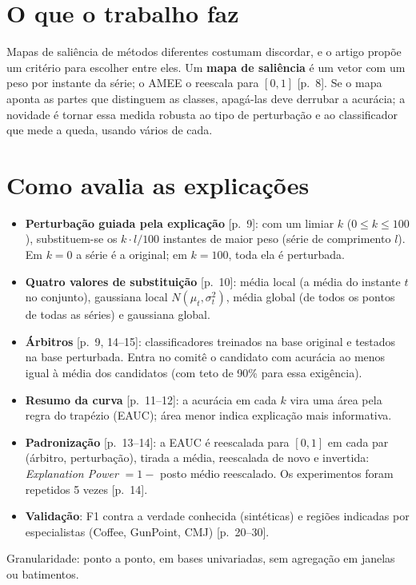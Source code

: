 \documentclass[11pt,a4paper]{article}
\begin{document}
\section{O que o trabalho faz}
Mapas de saliência de métodos diferentes costumam discordar, e o artigo propõe um critério para escolher entre eles. Um \textbf{mapa de saliência} é um vetor com um peso por instante da série; o AMEE o reescala para $[0,1]$ [p.~8]. Se o mapa aponta as partes que distinguem as classes, apagá-las deve derrubar a acurácia; a novidade é tornar essa medida robusta ao tipo de perturbação e ao classificador que mede a queda, usando vários de cada.

\section{Como avalia as explicações}
\begin{itemize}
\item \textbf{Perturbação guiada pela explicação} [p.~9]: com um limiar $k$ ($0 \le k \le 100$), substituem-se os $k \cdot l/100$ instantes de maior peso (série de comprimento $l$). Em $k=0$ a série é a original; em $k=100$, toda ela é perturbada.
\item \textbf{Quatro valores de substituição} [p.~10]: média local (a média do instante $t$ no conjunto), gaussiana local $N(\mu_t,\sigma_t^2)$, média global (de todos os pontos de todas as séries) e gaussiana global.
\item \textbf{Árbitros} [p.~9, 14--15]: classificadores treinados na base original e testados na base perturbada. Entra no comitê o candidato com acurácia ao menos igual à média dos candidatos (com teto de 90\% para essa exigência).
\item \textbf{Resumo da curva} [p.~11--12]: a acurácia em cada $k$ vira uma área pela regra do trapézio (EAUC); área menor indica explicação mais informativa.
\item \textbf{Padronização} [p.~13--14]: a EAUC é reescalada para $[0,1]$ em cada par (árbitro, perturbação), tirada a média, reescalada de novo e invertida: \textit{Explanation Power} $= 1 -$ posto médio reescalado. Os experimentos foram repetidos 5 vezes [p.~14].
\item \textbf{Validação}: F1 contra a verdade conhecida (sintéticas) e regiões indicadas por especialistas (Coffee, GunPoint, CMJ) [p.~20--30].
\end{itemize}
Granularidade: ponto a ponto, em bases univariadas, sem agregação em janelas ou batimentos.
\end{document}
